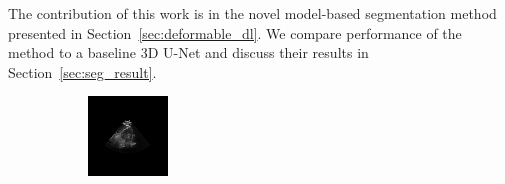 The contribution of this work is in the novel model-based segmentation method presented in Section~\ref{sec:deformable_dl}. We compare performance of the method to a baseline 3D U-Net and discuss their results in Section~\ref{sec:seg_result}.


\begin{figure}[htb]
        \begin{subfigure}[b]{0.245\textwidth}
                \centering
                \includegraphics[width=\linewidth]{img_seg/30_post}
        \end{subfigure}%
        \hspace{1px}
        \begin{subfigure}[b]{0.245\textwidth}
                \centering

\end{subfigure}
\end{figure}
